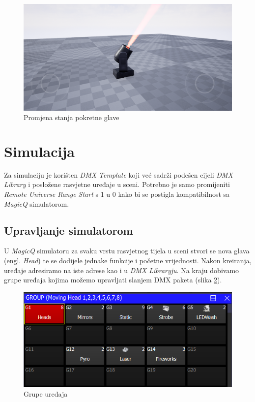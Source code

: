 \documentclass[times, utf8, zavrsni, numeric]{fer}
\begin{document}
\begin{figure}[htp]
	\centering
	\includegraphics[width=\linewidth]{slika 6-8.png}
	\caption{Promjena stanja pokretne glave}
	\label{fig:slika 6-8}
\end{figure}

\section{Simulacija}
Za simulaciju je korišten \emph{DMX Template} koji već sadrži podešen cijeli \emph{DMX Library} i posložene rasvjetne uređaje u sceni. Potrebno je samo promijeniti \emph{Remote Universe Range Start} s 1 u 0 kako bi se postigla kompatibilnost sa \emph{MagicQ} simulatorom.

\subsection{Upravljanje simulatorom}
U \emph{MagicQ} simulatoru za svaku vrstu rasvjetnog tijela u sceni stvori se nova glava (engl. \emph{Head}) te se dodijele jednake funkcije i početne vrijednosti. Nakon kreiranja, uređaje adresiramo na iste adrese kao i u \emph{DMX Libraryju}. Na kraju dobivamo grupe uređaja kojima možemo upravljati slanjem DMX paketa (slika \ref{fig:slika 6-9}).

\begin{figure}[htp]
	\centering
	\includegraphics[width=\linewidth]{slika 6-9.png}
	\caption{Grupe uređaja}
	\label{fig:slika 6-9}
\end{figure}
\end{document}
